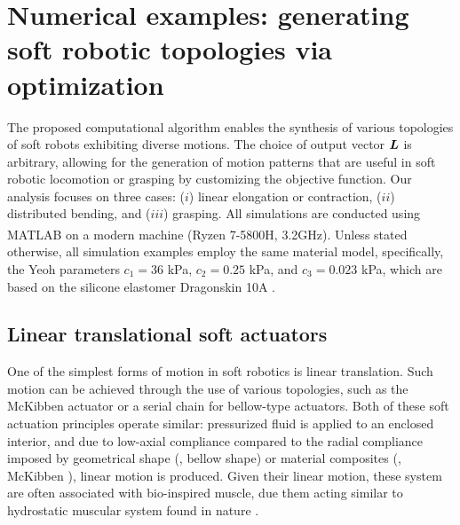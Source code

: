 \newpage
\section[Numerical examples: generating soft robotic topologies]{Numerical examples: generating soft robotic topologies via optimization}
\label{chap:results}
The proposed computational algorithm enables the synthesis of various topologies of soft robots exhibiting diverse motions. The choice of output vector ${\boldsymbol{L}}$ is arbitrary, allowing for the generation of motion patterns that are useful in soft robotic locomotion or grasping by customizing the objective function. Our analysis focuses on three cases: ($i$) linear elongation or contraction, ($ii$) distributed bending, and ($iii$) grasping. All simulations are conducted using MATLAB\textsuperscript{\scriptsize\textregistered} on a modern machine (Ryzen 7-5800H, 3.2GHz). Unless stated otherwise, all simulation examples employ the same material model, specifically, the Yeoh parameters $c_1 = 36$ kPa, $c_2 = 0.25$ kPa, and $c_3 = 0.023$ kPa, which are based on the silicone elastomer Dragonskin 10A \cite{Xavier2022Jun}.

\subsection{Linear translational soft actuators}
One of the simplest forms of motion in soft robotics is linear translation. Such motion can be achieved through the use of various topologies, such as the McKibben actuator or a serial chain for bellow-type actuators. Both of these soft actuation principles operate similar: pressurized fluid is applied to an enclosed interior, and due to low-axial compliance compared to the radial compliance imposed by geometrical shape (\eg, bellow shape) or material composites (\eg, McKibben \cite{Paynter1974,Paynter1988}), linear motion is produced.  Given their linear motion, these system are often associated with bio-inspired muscle, due them acting similar to hydrostatic muscular system found in nature \cite{Kier1985}. 
 
